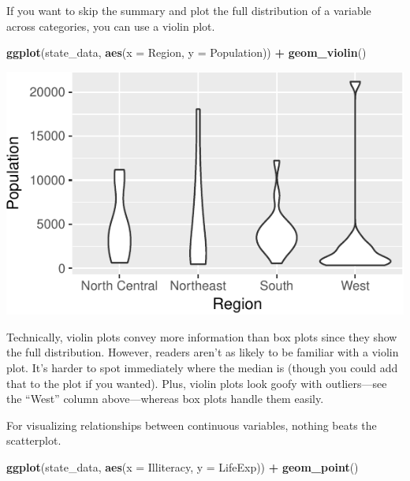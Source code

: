 \documentclass[12pt,oneside,openany]{book}
\newenvironment{Shaded}{\begin{snugshade}}{\end{snugshade}}
\newcommand{\KeywordTok}[1]{\textcolor[rgb]{0.13,0.29,0.53}{\textbf{#1}}}
\newcommand{\DataTypeTok}[1]{\textcolor[rgb]{0.13,0.29,0.53}{#1}}
\newcommand{\StringTok}[1]{\textcolor[rgb]{0.31,0.60,0.02}{#1}}
\newcommand{\OperatorTok}[1]{\textcolor[rgb]{0.81,0.36,0.00}{\textbf{#1}}}
\newcommand{\NormalTok}[1]{#1}
\begin{document}
If you want to skip the summary and plot the full distribution of a
variable across categories, you can use a violin plot.

\begin{Shaded}
\begin{Highlighting}[]
\KeywordTok{ggplot}\NormalTok{(state_data, }\KeywordTok{aes}\NormalTok{(}\DataTypeTok{x =}\NormalTok{ Region, }\DataTypeTok{y =}\NormalTok{ Population)) }\OperatorTok{+}
\StringTok{  }\KeywordTok{geom_violin}\NormalTok{()}
\end{Highlighting}
\end{Shaded}

\includegraphics{pdaps_files/figure-latex/violin-1.pdf}

Technically, violin plots convey more information than box plots since
they show the full distribution. However, readers aren't as likely to be
familiar with a violin plot. It's harder to spot immediately where the
median is (though you could add that to the plot if you wanted). Plus,
violin plots look goofy with outliers---see the ``West'' column
above---whereas box plots handle them easily.

For visualizing relationships between continuous variables, nothing
beats the scatterplot.

\begin{Shaded}
\begin{Highlighting}[]
\KeywordTok{ggplot}\NormalTok{(state_data, }\KeywordTok{aes}\NormalTok{(}\DataTypeTok{x =}\NormalTok{ Illiteracy, }\DataTypeTok{y =}\NormalTok{ LifeExp)) }\OperatorTok{+}
\StringTok{  }\KeywordTok{geom_point}\NormalTok{()}
\end{Highlighting}
\end{Shaded}
\end{document}
